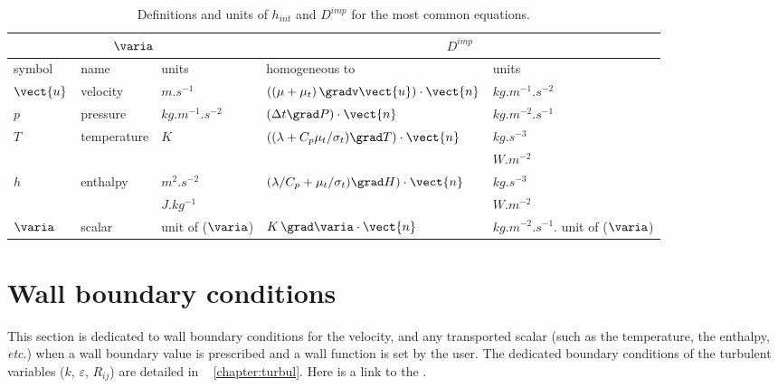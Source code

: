 \begin{table}
\begin{center}
\begin{tabular}{||l|l|l||l|l||}
\hline
\multicolumn{3}{||c||}{$\varia$} & \multicolumn{2}{c||}{$D^{imp}$} \\
\hline
symbol     & name                & units         & homogeneous to             & units                                     \\
\hline
$\vect{u}$ & velocity            & $m.s^{-1}$         &$\left( (\mu+\mu_t)\,\gradv \vect{u} \right)\cdot \vect{n}$  & $kg.m^{-1}.s^{-2} $       \\
$p$        & pressure            & $kg.m^{-1}.s^{-2}$ &$\left( \Delta t \grad P \right) \cdot \vect{n}$             & $kg.m^{-2}.s^{-1}$                        \\
$T$        & temperature         & $K$                &$\left( (\lambda+C_p\mu_t/\sigma_t)\grad T\right) \cdot \vect{n} $ &$kg.s^{-3}$ \\
                 &                         &                                     &                                  &$W.m^{-2}$ \\
$h$          & enthalpy           & $m^{2}.s^{-2}$          &$\left( \lambda/C_p+\mu_t/\sigma_t) \grad H \right) \cdot \vect{n}$&$kg.s^{-3}$ \\
                 &                        & $J.kg^{-1}$               &                                                                                                               & $W.m^{-2}$  \\
$\varia$   & scalar               & unit of ($\varia$)       &$K \,\grad \varia \cdot \vect{n}$              & $kg.m^{-2}.s^{-1}.$ unit of ($\varia$)       \\
\hline
\end{tabular}
\end{center}
\caption{Definitions and units of $h_{int}$ and $D^{imp}$ for the most common equations.}\label{tab:bndcnd:hint_phi_condli}
\end{table}


\section{Wall boundary conditions}\label{sec:clptur}

This section is dedicated to wall boundary conditions
 for the velocity, and any transported scalar (such as the temperature, the enthalpy, \emph{etc}.)
when a wall boundary value is prescribed and a wall function is set by the user. The dedicated boundary conditions of the turbulent variables ($k$, $\varepsilon$, $R_{ij}$) are detailed in \chaptername~ \ref{chapter:turbul}.
 Here is a link to the .

